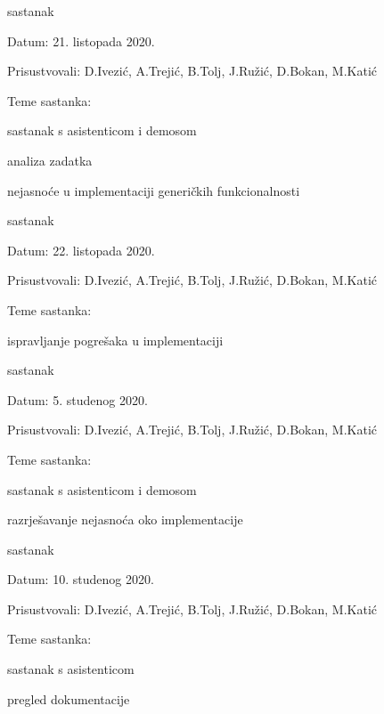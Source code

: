 \begin{packed_enum}
			\item  sastanak
			\item[] \begin{packed_item}
				\item Datum: 21. listopada 2020.
				\item Prisustvovali: D.Ivezić, A.Trejić, B.Tolj, J.Ružić, D.Bokan, M.Katić
				\item Teme sastanka:
				\begin{packed_item}
					\item  sastanak s asistenticom i demosom
					\item  analiza zadatka
					\item  nejasnoće u implementaciji generičkih funkcionalnosti
				\end{packed_item}
			\end{packed_item}
			
			\item  sastanak
			\item[] \begin{packed_item}
				\item Datum: 22. listopada 2020.
				\item Prisustvovali: D.Ivezić, A.Trejić, B.Tolj, J.Ružić, D.Bokan, M.Katić
				\item Teme sastanka:
				\begin{packed_item}
					\item  ispravljanje pogrešaka u implementaciji
				\end{packed_item}
			\end{packed_item}
			
			\item  sastanak
			\item[] \begin{packed_item}
				\item Datum: 5. studenog 2020.
				\item Prisustvovali: D.Ivezić, A.Trejić, B.Tolj, J.Ružić, D.Bokan, M.Katić
				\item Teme sastanka:
				\begin{packed_item}
					\item  sastanak s asistenticom i demosom
					\item  razrješavanje nejasnoća oko implementacije
				\end{packed_item}
			\end{packed_item}
			
			
			\item  sastanak
			\item[] \begin{packed_item}
				\item Datum: 10. studenog 2020.
				\item Prisustvovali: D.Ivezić, A.Trejić, B.Tolj, J.Ružić, D.Bokan, M.Katić
				\item Teme sastanka:
				\begin{packed_item}
					\item  sastanak s asistenticom
					\item  pregled dokumentacije
				\end{packed_item}
			\end{packed_item}
			

\end{packed_enum}
